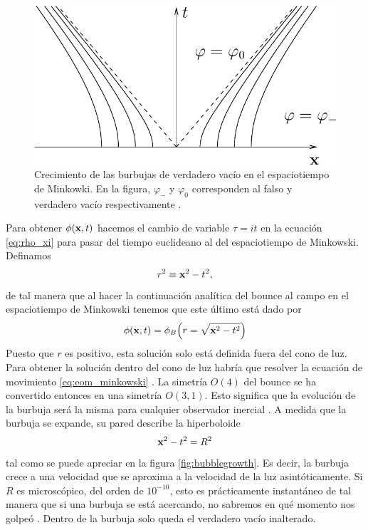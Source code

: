 \begin{figure}[t]
	\centering
	\includegraphics[scale=0.35]{FIGURAS/bubble_growth}
	\caption{Crecimiento de las burbujas de verdadero vacío en el espaciotiempo de Minkowki. En la figura, $\varphi_-$ y $\varphi_0$ corresponden al falso y verdadero vacío respectivamente \cite{rubakov2009classical}.}
	\label{fig:bubblegrowth}
\end{figure}

Para obtener $\phi\qty(\vb{x}, t)$ hacemos el cambio de variable $ \tau = it$ en la ecuación \eqref{eq:rho_xi} para pasar del tiempo euclideano al del espaciotiempo de Minkowski. Definamos
\begin{equation}
	r^2 \equiv \vb{x}^2 - t^2,
\end{equation}
de tal manera que al hacer la continuación analítica del bounce al campo en el espaciotiempo de Minkowski tenemos que este último está dado por
\begin{equation} 
	\phi\qty(\vb{x}, t) = \phi_B\qty(r = \sqrt{\vb{x}^2 - t^2}) 
\end{equation}
Puesto que $r$ es positivo, esta solución solo está definida fuera del cono de luz. Para obtener la solución dentro del cono de luz habría que resolver la ecuación de movimiento \eqref{eq:eom_minkowski} \cite{weinberg2012classical}. 
La simetría $O(4)$ del bounce se ha convertido entonces en una simetría $O(3, 1)$. Esto significa que la evolución de la burbuja será la misma para cualquier observador inercial \cite{coleman1977fate}. A medida que la burbuja se expande, su pared describe la hiperboloide
\begin{equation}
\vb{x}^2 - t^2 = R^2
\end{equation}
tal como se puede apreciar en la figura \eqref{fig:bubblegrowth}. Es decir, la burbuja crece a una velocidad que se aproxima a la velocidad de la luz asintóticamente. Si $R$ es microscópico, del orden de $10^{-10}$, esto es prácticamente instantáneo  de tal manera que si una burbuja se está acercando, no sabremos en qué momento nos golpeó \cite{paranjape2017theory}. Dentro de la burbuja solo queda el verdadero vacío inalterado.



